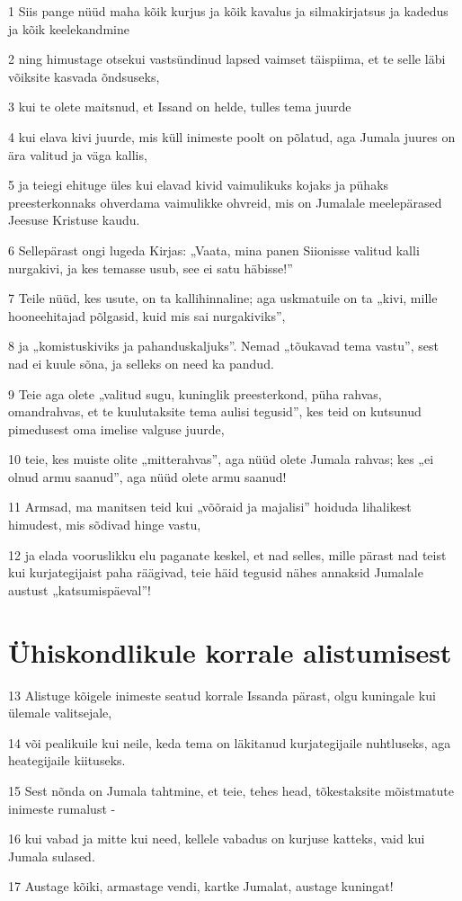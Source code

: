 \par 1 Siis pange nüüd maha kõik kurjus ja kõik kavalus ja silmakirjatsus ja kadedus ja kõik keelekandmine
\par 2 ning himustage otsekui vastsündinud lapsed vaimset täispiima, et te selle läbi võiksite kasvada õndsuseks,
\par 3 kui te olete maitsnud, et Issand on helde, tulles tema juurde
\par 4 kui elava kivi juurde, mis küll inimeste poolt on põlatud, aga Jumala juures on ära valitud ja väga kallis,
\par 5 ja teiegi ehituge üles kui elavad kivid vaimulikuks kojaks ja pühaks preesterkonnaks ohverdama vaimulikke ohvreid, mis on Jumalale meelepärased Jeesuse Kristuse kaudu.
\par 6 Sellepärast ongi lugeda Kirjas: „Vaata, mina panen Siionisse valitud kalli nurgakivi, ja kes temasse usub, see ei satu häbisse!”
\par 7 Teile nüüd, kes usute, on ta kallihinnaline; aga uskmatuile on ta „kivi, mille hooneehitajad põlgasid, kuid mis sai nurgakiviks”,
\par 8 ja „komistuskiviks ja pahanduskaljuks”. Nemad „tõukavad tema vastu”, sest nad ei kuule sõna, ja selleks on need ka pandud.
\par 9 Teie aga olete „valitud sugu, kuninglik preesterkond, püha rahvas, omandrahvas, et te kuulutaksite tema aulisi tegusid”, kes teid on kutsunud pimedusest oma imelise valguse juurde,
\par 10 teie, kes muiste olite „mitterahvas”, aga nüüd olete Jumala rahvas; kes „ei olnud armu saanud”, aga nüüd olete armu saanud!
\par 11 Armsad, ma manitsen teid kui „võõraid ja majalisi” hoiduda lihalikest himudest, mis sõdivad hinge vastu,
\par 12 ja elada vooruslikku elu paganate keskel, et nad selles, mille pärast nad teist kui kurjategijaist paha räägivad, teie häid tegusid nähes annaksid Jumalale austust „katsumispäeval”!

\section*{Ühiskondlikule korrale alistumisest}

\par 13 Alistuge kõigele inimeste seatud korrale Issanda pärast, olgu kuningale kui ülemale valitsejale,
\par 14 või pealikuile kui neile, keda tema on läkitanud kurjategijaile nuhtluseks, aga heategijaile kiituseks.
\par 15 Sest nõnda on Jumala tahtmine, et teie, tehes head, tõkestaksite mõistmatute inimeste rumalust -
\par 16 kui vabad ja mitte kui need, kellele vabadus on kurjuse katteks, vaid kui Jumala sulased.
\par 17 Austage kõiki, armastage vendi, kartke Jumalat, austage kuningat!

